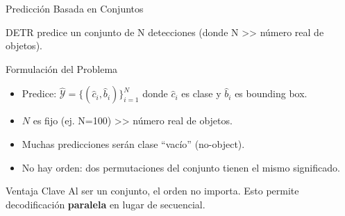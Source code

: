 \documentclass[aspectratio=169, 10pt]{beamer}
\begin{document}
\begin{frame}[shrink]{Predicci\'on Basada en Conjuntos}

	DETR predice un conjunto de N detecciones (donde N >> n\'umero real de objetos).

	\vspace{0.3cm}

	\begin{block}{Formulaci\'on del Problema}
		\begin{itemize}
			\item Predice: $\hat{\mathcal{Y}} = \{(\hat{c}_i, \hat{b}_i)\}_{i=1}^{N}$ donde $\hat{c}_i$ es clase y $\hat{b}_i$ es bounding box.
			\item $N$ es fijo (ej. N=100) >> n\'umero real de objetos.
			\item Muchas predicciones ser\'an clase ``vac\'io'' (no-object).
			\item No hay orden: dos permutaciones del conjunto tienen el mismo significado.
		\end{itemize}
	\end{block}

	\vspace{0.3cm}

	\begin{alertblock}{Ventaja Clave}
		Al ser un conjunto, el orden no importa. Esto permite decodificaci\'on \textbf{paralela} en lugar de secuencial.
	\end{alertblock}

\end{frame}
\end{document}

